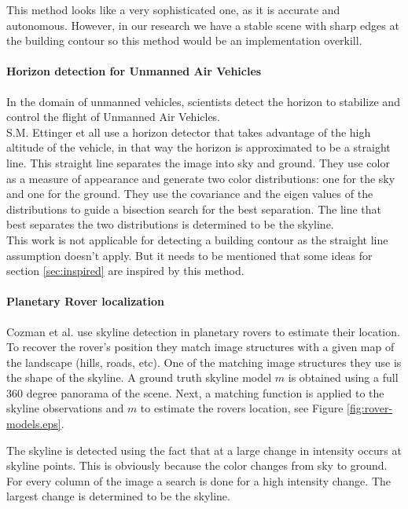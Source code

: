 This method looks like a very sophisticated one, as it is accurate and autonomous.
However, in our research we have a stable scene with sharp edges at the building
contour so this method would be an implementation overkill. \\


\paragraph{Horizon detection for Unmanned Air Vehicles}
In the domain \cite{Guidedflight} of unmanned vehicles, scientists detect the horizon to stabilize and control the
flight of Unmanned Air Vehicles.\\  
S.M. Ettinger et all \cite{Guidedflight} use a horizon detector that takes
advantage of the high altitude of the vehicle, in that way the horizon is
approximated to be a straight line. 
This straight line separates the image into sky and ground. They use color as
a measure of appearance and generate two color distributions: one for the sky
and one for the ground. They use the covariance and the eigen values of the
distributions to guide a bisection search for the best separation. The line that
best separates the two distributions is determined to be the skyline.\\

This work is not applicable for detecting a building contour as the straight
line assumption doesn't apply. But it needs to be mentioned that some ideas for
section \ref{sec:inspired} are inspired by this method.

\paragraph{Planetary Rover localization}
Cozman et al. \cite{Rover} use skyline detection in planetary rovers to estimate 
their location. 
To recover the rover's position they match image structures with a given map
of the landscape (hills, roads, etc). One of the matching image structures they
use is the shape of the skyline.
A ground truth skyline model $m$ is obtained using a full 360 degree panorama of the scene.
Next, a matching function is applied to the skyline observations and $m$ to estimate
the rovers location, see Figure \ref{fig:rover-models.eps}. 


The skyline is detected using the fact that at a large change in intensity
occurs at skyline points. This is obviously because the color changes from sky to ground.
For every column of the image a search is done for a high intensity change. The 
largest change is determined to be the skyline.\\

